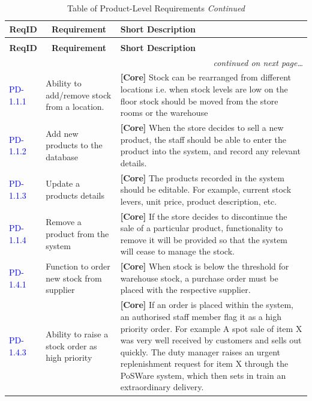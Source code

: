 \documentclass[a4paper]{article}
\begin{document}
\begin{longtable}{|l|p{5cm}|p{8cm}|}
  \caption{Table of Product-Level Requirements}\\
  \hline
  \multicolumn{1}{|c|}{\textbf{ReqID}}  &
  \multicolumn{1}{|c|}{\textbf{Requirement}} &
  \textbf{Short Description}\\
  \hline\hline
  \endfirsthead
  \caption[]{Table of Product-Level Requirements \textit{Continued}}\\
  \hline
  \multicolumn{1}{|c|}{\textbf{ReqID}} &
  \multicolumn{1}{|c|}{\textbf{Requirement}} &
  \textbf{Short Description}\\
  \hline\hline
  \endhead
  \hline
  \multicolumn{3}{r}{\textit{continued on next page\ldots}}\\
  \endfoot
  \hline
  \endlastfoot
\textcolor{blue}{PD-1.1.1} & Ability to add/remove stock from a location. & \textbf{[Core] }Stock can be rearranged from different locations i.e. when stock levels are low on the floor stock should be moved from the store rooms or the warehouse\\
\textcolor{blue}{PD-1.1.2} & Add new products to the database & \textbf{[Core] }When the store decides to sell a new product, the staff should be able to enter the product into the system, and record any relevant details.\\
\textcolor{blue}{PD-1.1.3} & Update a products details & \textbf{[Core] }The products recorded in the system should be editable. For example, current stock levers, unit price, product description, etc.\\
\textcolor{blue}{PD-1.1.4} & Remove a product from the system & \textbf{[Core] }If the store decides to discontinue the sale of a particular product, functionality to remove it will be provided so that the system will cease to manage the stock.\\
\hline
\textcolor{blue}{PD-1.4.1} & Function to order new stock from supplier & \textbf{[Core] }When stock is below the threshold for warehouse stock, a purchase order must be placed with the respective supplier.\\
\textcolor{blue}{PD-1.4.3} & Ability to raise a stock order as high priority & \textbf{[Core] }If an order is placed within the system, an authorised staff member flag it as a high priority order. For example A spot sale of item X was very well received by customers and sells out quickly. The duty manager raises an urgent replenishment request for item X through the PoSWare system, which then sets in train an extraordinary delivery.\\

\end{longtable}
\end{document}
